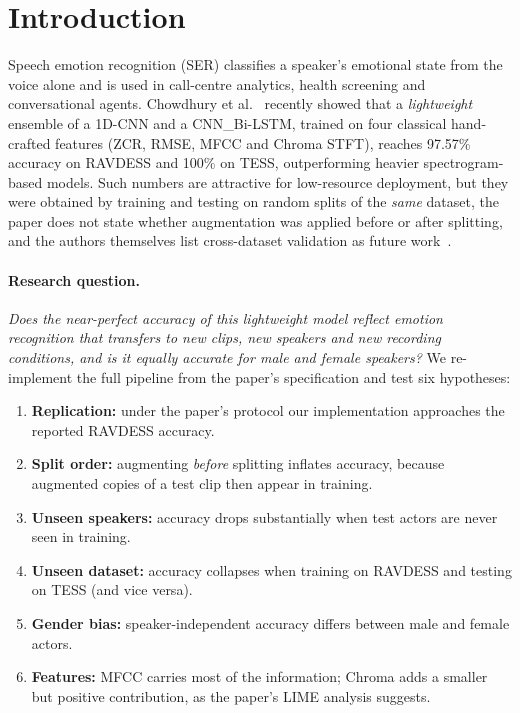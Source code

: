 \section{Introduction}
Speech emotion recognition (SER) classifies a speaker's emotional state from the voice alone and is used in
call-centre analytics, health screening and conversational agents. Chowdhury et al.~\cite{chowdhury2025}
recently showed that a \emph{lightweight} ensemble of a 1D-CNN and a CNN\_Bi-LSTM, trained on four classical
hand-crafted features (ZCR, RMSE, MFCC and Chroma STFT), reaches 97.57\% accuracy on RAVDESS and 100\% on TESS,
outperforming heavier spectrogram-based models. Such numbers are attractive for low-resource deployment, but they
were obtained by training and testing on random splits of the \emph{same} dataset, the paper does not state whether
augmentation was applied before or after splitting, and the authors themselves list cross-dataset validation as
future work~\cite[Sec.~7]{chowdhury2025}.

\paragraph{Research question.} \emph{Does the near-perfect accuracy of this lightweight model reflect emotion
recognition that transfers to new clips, new speakers and new recording conditions, and is it equally accurate for
male and female speakers?} We re-implement the full pipeline from the paper's specification and test six hypotheses:
\begin{enumerate}[label=\textbf{H\arabic*}]
  \item \textbf{Replication:} under the paper's protocol our implementation approaches the reported RAVDESS accuracy.
  \item \textbf{Split order:} augmenting \emph{before} splitting inflates accuracy, because augmented copies of a
        test clip then appear in training.
  \item \textbf{Unseen speakers:} accuracy drops substantially when test actors are never seen in training.
  \item \textbf{Unseen dataset:} accuracy collapses when training on RAVDESS and testing on TESS (and vice versa).
  \item \textbf{Gender bias:} speaker-independent accuracy differs between male and female actors.
  \item \textbf{Features:} MFCC carries most of the information; Chroma adds a smaller but positive contribution,
        as the paper's LIME analysis suggests.
\end{enumerate}

